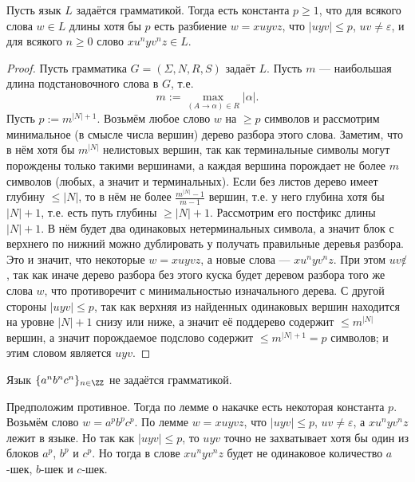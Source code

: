 \documentclass[12pt,a4paper]{article}
\begin{document}
    \begin{lemma}
        Пусть язык $L$ задаётся грамматикой. Тогда есть константа $p \geqslant 1$, что для всякого слова $w \in L$ длины хотя бы $p$ есть разбиение $w = xuyvz$, что $|uyv| \leqslant p$, $uv \neq \varepsilon$, и для всякого $n \geqslant 0$ слово $x u^n y v^n z \in L$.
    \end{lemma}

    \begin{proof}
        Пусть грамматика $G = (\Sigma, N, R, S)$ задаёт $L$. Пусть $m$ --- наибольшая длина подстановочного слова в $G$, т.е.
        \[m := \max_{(A \to \alpha) \in R} |\alpha|.\]
        Пусть $p := m^{|N| + 1}$. Возьмём любое слово $w$ на $\geqslant p$ символов и рассмотрим минимальное (в смысле числа вершин) дерево разбора этого слова. Заметим, что в нём хотя бы $m^{|N|}$ нелистовых вершин, так как терминальные символы могут порождены только такими вершинами, а каждая вершина порождает не более $m$ символов (любых, а значит и терминальных). Если без листов дерево имеет глубину $\leqslant |N|$, то в нём не более $\frac{m^{|N|} - 1}{m-1}$ вершин, т.е. у него глубина хотя бы $|N| + 1$, т.е. есть путь глубины $\geqslant |N| + 1$. Рассмотрим его постфикс длины $|N| + 1$. В нём будет два одинаковых нетерминальных символа, а значит блок с верхнего по нижний можно дублировать у получать правильные деревья разбора. Это и значит, что некоторые $w = xuyvz$, а новые слова --- $x u^n y v^n z$. При этом $uv \not \varepsilon$, так как иначе дерево разбора без этого куска будет деревом разбора того же слова $w$, что противоречит с минимальностью изначального дерева. С другой стороны $|uyv| \leqslant p$, так как верхняя из найденных одинаковых вершин находится на уровне $|N| + 1$ снизу или ниже, а значит её поддерево содержит $\leqslant m^{|N|}$ вершин, а значит порождаемое подслово содержит $\leqslant m^{|N| + 1} = p$ символов; и этим словом является $uyv$.
    \end{proof}

    \begin{example}
        Язык $\{a^n b^n c^n\}_{n \in \ZZ}$ не задаётся грамматикой.

        Предположим противное. Тогда по лемме о накачке есть некоторая константа $p$. Возьмём слово $w = a^p b^p c^p$. По лемме $w = xuyvz$, что $|uyv| \leqslant p$, $uv \neq \varepsilon$, а $x u^n y v^n z$ лежит в языке. Но так как $|uyv| \leqslant p$, то $uyv$ точно не захватывает хотя бы один из блоков $a^p$, $b^p$ и $c^p$. Но тогда в слове $x u^n y v^n z$ будет не одинаковое количество $a$-шек, $b$-шек и $c$-шек. 
    \end{example}
\end{document}
